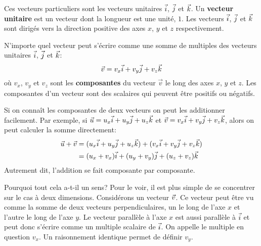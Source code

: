 Ces vecteurs particuliers sont les vecteurs unitaires $\vec{i}$, $\vec{j}$ et
$\vec{k}$.  Un \textbf{vecteur unitaire} est un vecteur dont la longueur est une
unité, $1$.  Les vecteurs $\vec{i}$, $\vec{j}$ et $\vec{k}$ sont dirigés vers la
direction positive des axes $x$, $y$ et $z$ respectivement.

\begin{marginfigure}
\end{marginfigure}

N'importe quel vecteur peut s'écrire comme une somme de multiples des vecteurs
unitaires $\vec{i}$, $\vec{j}$ et $\vec{k}$:
\[
  \vec{v} = v_x \vec{i} + v_y \vec{j} + v_z \vec{k}
\]
où $v_x$, $v_y$ et $v_z$ sont les \textbf{composantes} du vecteur $\vec{v}$
le long des axes $x$, $y$ et $z$.  Les composantes d'un vecteur sont des
scalaires qui peuvent être positifs ou négatifs.

Si on connaît les composantes de deux vecteurs on peut les additionner
facilement.  Par exemple, si $\vec{u} = u_x \vec{i} + u_y\vec{j} + u_z\vec{k}$ et
$\vec{v} = v_x \vec{i} + v_y\vec{j} + v_z\vec{k}$, alors on peut calculer la somme
directement:
\begin{align*}
  \vec{u} + \vec{v} &= (u_x \vec{i} + u_y\vec{j} + u_z\vec{k})
             + (v_x \vec{i} + v_y\vec{j} + v_z\vec{k}) \\
            &= (u_x + v_x) \vec{i} + (u_y + v_y) \vec{j} + (u_z + v_z) \vec{k}
\end{align*}
Autrement dit, l'addition se fait composante par composante.

\begin{marginfigure}
\end{marginfigure}
Pourquoi tout cela a-t-il un sens? Pour le voir, il est plus simple de se
concentrer sur le cas à deux dimensions.  Considérons un vecteur $\vec{v}$.  Ce
vecteur peut être vu comme la somme de deux vecteurs perpendiculaires, un le
long de l'axe $x$ et l'autre le long de l'axe $y$.  Le vecteur parallèle à
l'axe $x$ est aussi parallèle à $\vec{i}$ et peut donc s'écrire comme un multiple
scalaire de $\vec{i}$.  On appelle le multiple en question $v_x$.  Un
raisonnement identique permet de définir $v_y$.

